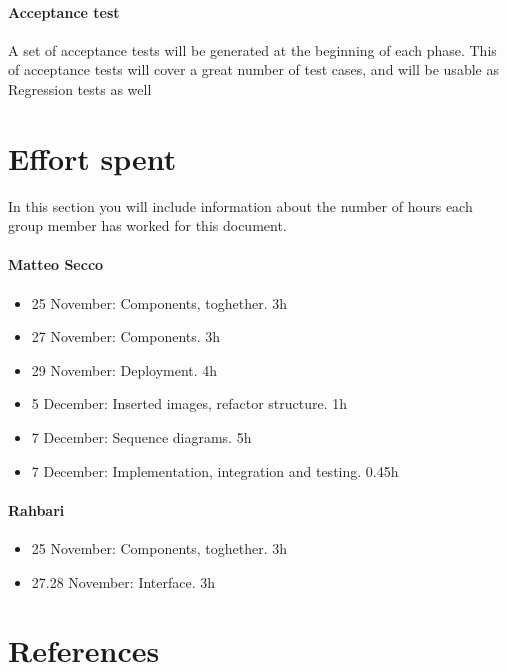 \documentclass{article}
\begin{document}
\paragraph{Acceptance test} A set of acceptance tests will be generated at the beginning of each phase. This of acceptance tests will cover a great number of test cases, and will be usable as Regression tests as well

\section{Effort spent}In	 this	 section	you	will	include	information	about	 the	number	of	hours	each	
group	member	has	worked	for	this	document.
	\paragraph{Matteo Secco}
		\begin{itemize}
			\item 25 November: Components, toghether. 3h
			\item 27 November: Components. 3h
			\item 29 November: Deployment. 4h
			\item 5 December: Inserted images, refactor structure. 1h
			\item 7 December: Sequence diagrams. 5h
			\item 7 December: Implementation, integration and testing. 0.45h
		\end{itemize}
	\paragraph{Rahbari}
		\begin{itemize}
			\item 25 November: Components, toghether. 3h
			\item 27.28 November: Interface. 3h
		\end{itemize}
\section{References}
\end{document}
